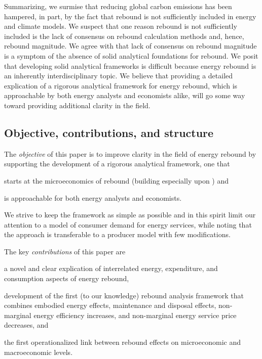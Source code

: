 \documentclass[12pt]{article}\usepackage[]{graphicx}\usepackage[]{xcolor}
\begin{document}
Summarizing,
we surmise that reducing global carbon emissions has been hampered, in part, 
by the fact that rebound is not sufficiently included in energy and climate models.
We suspect that one reason rebound is not sufficiently included
is the lack of consensus on rebound calculation methods and, hence, rebound magnitude.
We agree with \citeauthor{Turner:2013aa} that lack of consensus on rebound magnitude
is a symptom of the absence of solid analytical foundations for rebound.
We posit that developing solid analytical frameworks 
is difficult because energy rebound is an inherently interdisciplinary topic.
We believe that providing a detailed explication of a rigorous analytical framework
for energy rebound,
which is approachable by both energy analysts and economists alike,
will go some way toward providing additional clarity in the field.


\subsection{Objective, contributions, and structure}
\label{sec:objective_contributions_structure}

The \emph{objective} of this paper is to 
improve clarity in the field of energy rebound by
supporting the development of a rigorous analytical framework, 
one that
%
\begin{enumerate*}[label={(\roman*)}]

  \item starts at the microeconomics of rebound
        (building especially upon \citet{Borenstein:2015aa}) and 
        
  \item is approachable for both energy analysts and economists.

\end{enumerate*}
%
We strive to keep the framework as simple as possible and in this spirit limit our
attention to a model of consumer demand for energy services, while noting that
the approach is transferable to a producer model with few modifications.

The key \emph{contributions} of this paper are 
%
\begin{enumerate*}[label={(\roman*)}]
	
	\item a novel and clear explication of interrelated
	      energy, expenditure, and consumption
	      aspects of energy rebound,
	
  \item development of the first (to our knowledge)
        rebound analysis framework that combines 
        embodied energy effects, 
        maintenance and disposal effects, 
        non-marginal energy efficiency increases, and 
        non-marginal energy service price decreases, and

  \item the first operationalized link between 
        rebound effects on microeconomic and macroeconomic levels.
        
\end{enumerate*}
\end{document}
